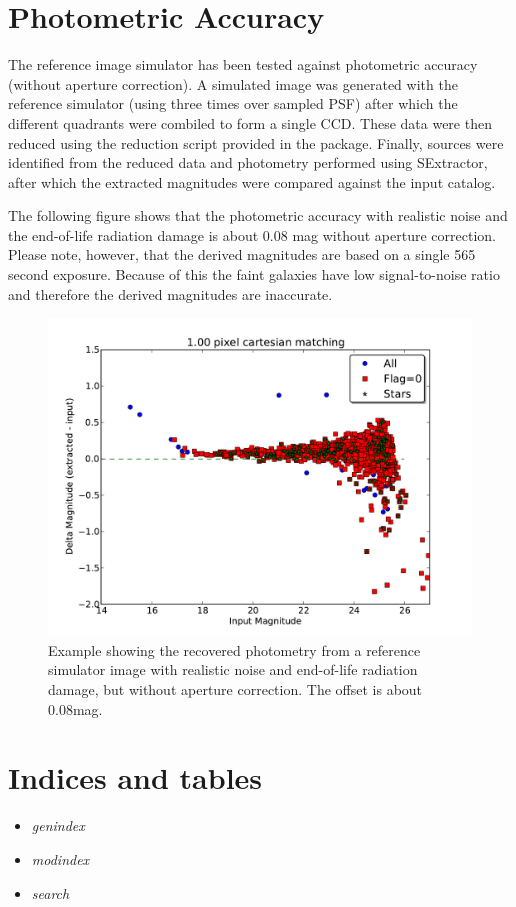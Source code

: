 \documentclass[a4paper,12pt,english]{sphinxmanual}
\begin{document}
\chapter{Photometric Accuracy}
\label{index:photometric-accuracy}
The reference image simulator has been tested against photometric accuracy (without aperture correction). A
simulated image was generated with the reference simulator (using three times over sampled PSF) after
which the different quadrants were combiled to form a single CCD. These data were then reduced using the
reduction script provided in the package. Finally, sources were identified from the reduced data and photometry performed
using SExtractor, after which the extracted magnitudes were compared against the input catalog.

The following
figure shows that the photometric accuracy with realistic noise and the end-of-life radiation damage is
about 0.08 mag without aperture correction. Please note, however, that the derived magnitudes are based on a
single 565 second exposure. Because of this the faint galaxies have low signal-to-noise ratio and therefore
the derived magnitudes are inaccurate.
\begin{figure}[htbp]
\centering
\capstart

\includegraphics{Magnitudes15.pdf}
\caption{Example showing the recovered photometry from a reference simulator image with realistic noise
and end-of-life radiation damage, but without aperture correction. The offset is about 0.08mag.}\end{figure}


\chapter{Indices and tables}
\label{index:indices-and-tables}\begin{itemize}
\item {} 
\emph{genindex}

\item {} 
\emph{modindex}

\item {} 
\emph{search}

\end{itemize}
\end{document}
